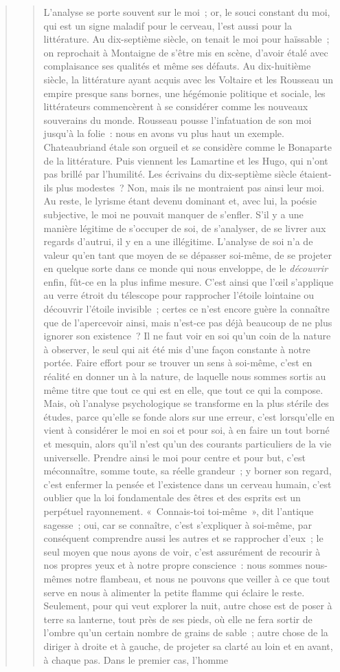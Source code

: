 \documentclass[french,twoside]{book} %
\begin{document}
\begin{verse}
\begin{verse}
L’analyse se porte souvent sur le moi ; or, le souci constant du moi, qui est un signe maladif pour le cerveau, l’est aussi pour la littérature. Au dix-septième siècle, on tenait le moi pour haïssable ; on reprochait à Montaigne de s’être mis en scène, d’avoir étalé avec complaisance ses qualités et même ses défauts. Au dix-huitième siècle, la littérature ayant acquis avec les Voltaire et les Rousseau un empire presque sans bornes, une hégémonie politique et sociale, les littérateurs commencèrent à se considérer comme les nouveaux souverains du monde. Rousseau pousse l’infatuation de son moi jusqu’à la folie : nous en avons vu plus haut un exemple. Chateaubriand étale son orgueil et se considère comme le Bonaparte de la littérature. Puis viennent les Lamartine et les Hugo, qui n’ont pas brillé par l’humilité. Les écrivains du dix-septième siècle étaient-ils plus modestes ? Non, mais ils ne montraient pas ainsi leur moi. Au reste, le lyrisme étant devenu dominant et, avec lui, la poésie subjective, le moi ne pouvait manquer de s’enfler. S’il y a une manière légitime de s’occuper de soi, de s’analyser, de se livrer aux regards d’autrui, il y en a une illégitime. L’analyse de soi n’a de valeur qu’en tant que moyen de se dépasser soi-même, de se projeter en quelque sorte dans ce monde qui nous enveloppe, de le \emph{découvrir} enfin, fût-ce en la plus infime mesure. C’est ainsi que l’œil s’applique au verre étroit du télescope pour rapprocher l’étoile lointaine ou découvrir l’étoile invisible ; certes ce n’est encore guère la connaître que de l’apercevoir ainsi, mais n’est-ce pas déjà beaucoup de ne plus ignorer son existence ? Il ne faut voir en soi qu’un coin de la nature à observer, le seul qui ait été mis d’une façon constante à notre portée. Faire effort pour se trouver un sens à soi-même, c’est en réalité en donner un à la nature, de laquelle nous sommes sortis au même titre que tout ce qui est en elle, que tout ce qui la compose. Mais, où l’analyse psychologique se transforme en la plus stérile des études, parce qu’elle se fonde alors sur une erreur, c’est lorsqu’elle en vient à considérer le moi en soi et pour soi, à en faire un tout borné et mesquin, alors qu’il n’est qu’un des courants particuliers de la vie universelle. Prendre ainsi le moi pour centre et pour but, c’est méconnaître, somme toute, sa réelle grandeur ; y borner son regard, c’est enfermer la pensée et l’existence dans un cerveau humain, c’est oublier que la loi fondamentale des êtres et des esprits est un perpétuel rayonnement. « Connais-toi toi-même », dit l’antique sagesse ; oui, car se connaître, c’est s’expliquer à soi-même, par conséquent comprendre aussi les autres et se rapprocher d’eux ; le seul moyen que nous ayons de voir, c’est assurément de recourir à nos propres yeux et à notre propre conscience : nous sommes nous-mêmes notre flambeau, et nous ne pouvons que veiller à ce que tout serve en nous à alimenter la petite flamme qui éclaire le reste. Seulement, pour qui veut explorer la nuit, autre chose est de poser à terre sa lanterne, tout près de ses pieds, où elle ne fera sortir de l’ombre qu’un certain nombre de grains de sable ; autre chose de la diriger à droite et à gauche, de projeter sa clarté au loin et en avant, à chaque pas. Dans le premier cas, l’homme 
\end{verse}
\end{verse}
\end{document}
